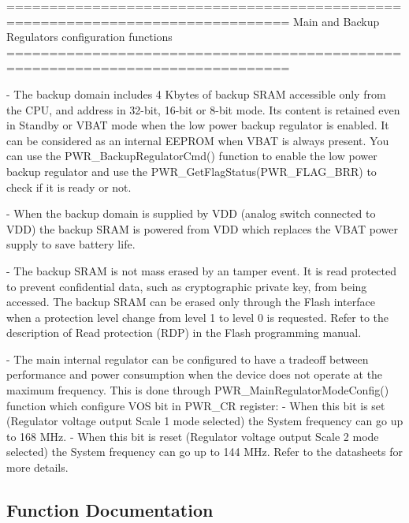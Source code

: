 \begin{DoxyVerb} ===============================================================================
                    Main and Backup Regulators configuration functions
 ===============================================================================  

 - The backup domain includes 4 Kbytes of backup SRAM accessible only from the 
   CPU, and address in 32-bit, 16-bit or 8-bit mode. Its content is retained 
   even in Standby or VBAT mode when the low power backup regulator is enabled. 
   It can be considered as an internal EEPROM when VBAT is always present.
   You can use the PWR_BackupRegulatorCmd() function to enable the low power
   backup regulator and use the PWR_GetFlagStatus(PWR_FLAG_BRR) to check if it is
   ready or not. 

 - When the backup domain is supplied by VDD (analog switch connected to VDD) 
   the backup SRAM is powered from VDD which replaces the VBAT power supply to 
   save battery life.

 - The backup SRAM is not mass erased by an tamper event. It is read protected 
   to prevent confidential data, such as cryptographic private key, from being 
   accessed. The backup SRAM can be erased only through the Flash interface when
   a protection level change from level 1 to level 0 is requested. 
   Refer to the description of Read protection (RDP) in the Flash programming manual.

 - The main internal regulator can be configured to have a tradeoff between performance
   and power consumption when the device does not operate at the maximum frequency. 
   This is done through PWR_MainRegulatorModeConfig() function which configure VOS bit
   in PWR_CR register: 
      - When this bit is set (Regulator voltage output Scale 1 mode selected) the System
        frequency can go up to 168 MHz. 
      - When this bit is reset (Regulator voltage output Scale 2 mode selected) the System
        frequency can go up to 144 MHz. 
   Refer to the datasheets for more details.\end{DoxyVerb}
 

\subsection{Function Documentation}
\hypertarget{group___p_w_r___group4_ga83a4d6c5b048f2dab18e8fb04f5368d7}{}
